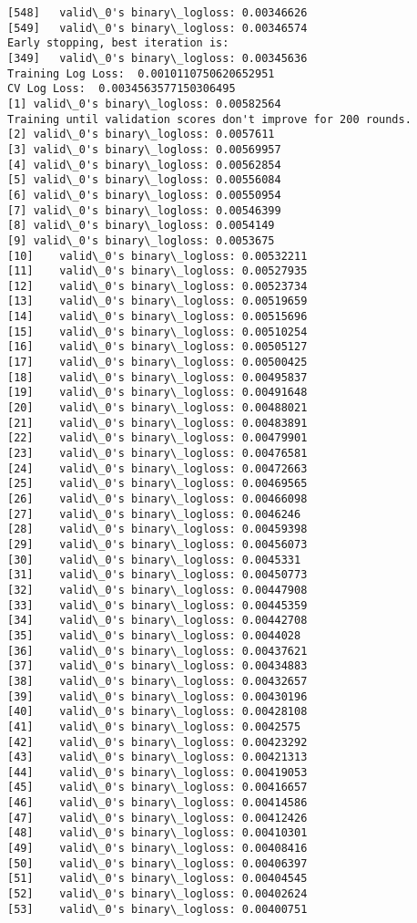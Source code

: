 \documentclass[11pt]{article}
\begin{document}
\begin{Verbatim}[commandchars=\\\{\}]
[548]	valid\_0's binary\_logloss: 0.00346626
[549]	valid\_0's binary\_logloss: 0.00346574
Early stopping, best iteration is:
[349]	valid\_0's binary\_logloss: 0.00345636
Training Log Loss:  0.0010110750620652951
CV Log Loss:  0.0034563577150306495
[1]	valid\_0's binary\_logloss: 0.00582564
Training until validation scores don't improve for 200 rounds.
[2]	valid\_0's binary\_logloss: 0.0057611
[3]	valid\_0's binary\_logloss: 0.00569957
[4]	valid\_0's binary\_logloss: 0.00562854
[5]	valid\_0's binary\_logloss: 0.00556084
[6]	valid\_0's binary\_logloss: 0.00550954
[7]	valid\_0's binary\_logloss: 0.00546399
[8]	valid\_0's binary\_logloss: 0.0054149
[9]	valid\_0's binary\_logloss: 0.0053675
[10]	valid\_0's binary\_logloss: 0.00532211
[11]	valid\_0's binary\_logloss: 0.00527935
[12]	valid\_0's binary\_logloss: 0.00523734
[13]	valid\_0's binary\_logloss: 0.00519659
[14]	valid\_0's binary\_logloss: 0.00515696
[15]	valid\_0's binary\_logloss: 0.00510254
[16]	valid\_0's binary\_logloss: 0.00505127
[17]	valid\_0's binary\_logloss: 0.00500425
[18]	valid\_0's binary\_logloss: 0.00495837
[19]	valid\_0's binary\_logloss: 0.00491648
[20]	valid\_0's binary\_logloss: 0.00488021
[21]	valid\_0's binary\_logloss: 0.00483891
[22]	valid\_0's binary\_logloss: 0.00479901
[23]	valid\_0's binary\_logloss: 0.00476581
[24]	valid\_0's binary\_logloss: 0.00472663
[25]	valid\_0's binary\_logloss: 0.00469565
[26]	valid\_0's binary\_logloss: 0.00466098
[27]	valid\_0's binary\_logloss: 0.0046246
[28]	valid\_0's binary\_logloss: 0.00459398
[29]	valid\_0's binary\_logloss: 0.00456073
[30]	valid\_0's binary\_logloss: 0.0045331
[31]	valid\_0's binary\_logloss: 0.00450773
[32]	valid\_0's binary\_logloss: 0.00447908
[33]	valid\_0's binary\_logloss: 0.00445359
[34]	valid\_0's binary\_logloss: 0.00442708
[35]	valid\_0's binary\_logloss: 0.0044028
[36]	valid\_0's binary\_logloss: 0.00437621
[37]	valid\_0's binary\_logloss: 0.00434883
[38]	valid\_0's binary\_logloss: 0.00432657
[39]	valid\_0's binary\_logloss: 0.00430196
[40]	valid\_0's binary\_logloss: 0.00428108
[41]	valid\_0's binary\_logloss: 0.0042575
[42]	valid\_0's binary\_logloss: 0.00423292
[43]	valid\_0's binary\_logloss: 0.00421313
[44]	valid\_0's binary\_logloss: 0.00419053
[45]	valid\_0's binary\_logloss: 0.00416657
[46]	valid\_0's binary\_logloss: 0.00414586
[47]	valid\_0's binary\_logloss: 0.00412426
[48]	valid\_0's binary\_logloss: 0.00410301
[49]	valid\_0's binary\_logloss: 0.00408416
[50]	valid\_0's binary\_logloss: 0.00406397
[51]	valid\_0's binary\_logloss: 0.00404545
[52]	valid\_0's binary\_logloss: 0.00402624
[53]	valid\_0's binary\_logloss: 0.00400751

\end{Verbatim}
\end{document}

